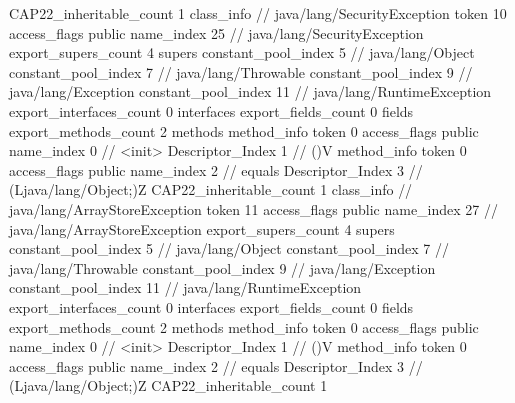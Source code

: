 {{{{{				}
			}
			CAP22_inheritable_count	1
		}
		class_info {		// java/lang/SecurityException
			token	10
			access_flags	public
			name_index	25		// java/lang/SecurityException
			export_supers_count	4
			supers {
				constant_pool_index	5		// java/lang/Object
				constant_pool_index	7		// java/lang/Throwable
				constant_pool_index	9		// java/lang/Exception
				constant_pool_index	11		// java/lang/RuntimeException
			}
			export_interfaces_count	0
			interfaces {
			}
			export_fields_count	0
			fields {
			}
			export_methods_count	2
			methods {
				method_info {
					token	0
					access_flags	public
					name_index	0		// <init>
					Descriptor_Index	1		// ()V
				}
				method_info {
					token	0
					access_flags	public
					name_index	2		// equals
					Descriptor_Index	3		// (Ljava/lang/Object;)Z
				}
			}
			CAP22_inheritable_count	1
		}
		class_info {		// java/lang/ArrayStoreException
			token	11
			access_flags	public
			name_index	27		// java/lang/ArrayStoreException
			export_supers_count	4
			supers {
				constant_pool_index	5		// java/lang/Object
				constant_pool_index	7		// java/lang/Throwable
				constant_pool_index	9		// java/lang/Exception
				constant_pool_index	11		// java/lang/RuntimeException
			}
			export_interfaces_count	0
			interfaces {
			}
			export_fields_count	0
			fields {
			}
			export_methods_count	2
			methods {
				method_info {
					token	0
					access_flags	public
					name_index	0		// <init>
					Descriptor_Index	1		// ()V
				}
				method_info {
					token	0
					access_flags	public
					name_index	2		// equals
					Descriptor_Index	3		// (Ljava/lang/Object;)Z
				}
			}
			CAP22_inheritable_count	1
		}
	}
}
